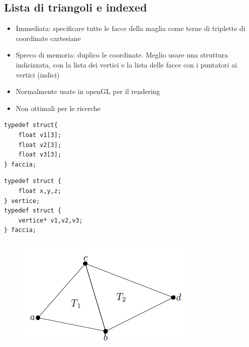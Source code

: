 \documentclass[a4paper, 10pt]{article}
\begin{document}
	\subsection{Lista di triangoli e indexed}
		\begin{itemize}
			\item Immediata: specificare tutte le facce della maglia come
			terne di triplette di coordinate cartesiane
			\item Spreco di memoria: duplico le coordinate. Meglio usare
			una struttura indicizzata, con la lista dei vertici e la
			lista delle facce con i	puntatori ai vertici (indici)
			\item Normalmente usate in openGL per il rendering
			\item Non ottimali per le ricerche
		\end{itemize}
		\begin{multicols}{2}
			\begin{lstlisting}
typedef struct{
	float v1[3];
	float v2[3];
	float v3[3];
} faccia;
			\end{lstlisting}
			\columnbreak
		\begin{lstlisting}
typedef struct {
	float x,y,z;
} vertice;
typedef struct {
	vertice* v1,v2,v3;
} faccia;
		\end{lstlisting}
		\end{multicols}
		
		\begin{figure}[h!]
			\vspace*{-1.2cm}
			\includegraphics[scale=0.4]{mesh}
		\end{figure}
	
\end{document}
